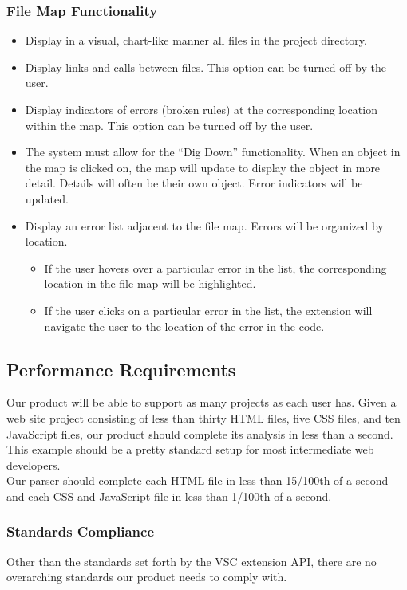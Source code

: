 \documentclass[letterpaper,10pt,titlepage,draftclsnofoot,onecolumn,onesided] {IEEEtran}
\begin{document}
\subsubsection{File Map Functionality}
\begin{itemize}
	\item Display in a visual, chart-like manner all files in the project directory.
    \item Display links and calls between files. This option can be turned off by the user.
    \item Display indicators of errors (broken rules) at the corresponding location within the map. This option can be turned off by the user.
    \item The system must allow for the “Dig Down” functionality. When an object in the map is clicked on, the map will update to display the object in more detail. Details will often be their own object. Error indicators will be updated.
    \item Display an error list adjacent to the file map. Errors will be organized by location.
    \begin{itemize}
    	\item If the user hovers over a particular error in the list, the corresponding location in the file map will be 	highlighted.
        \item If the user clicks on a particular error in the list, the extension will navigate the user to the location of the error in the code.
    \end{itemize}
\end{itemize}

\subsection{Performance Requirements}
Our product will be able to support as many projects as each user has. 
Given a web site project consisting of less than thirty HTML files, five CSS files, and ten JavaScript files, our product should complete its analysis in less than a second. 
This example should be a pretty standard setup for most intermediate web developers.
\\
Our parser should complete each HTML file in less than 15/100th of a second and each CSS and JavaScript file in less than 1/100th of a second.

\subsubsection{Standards Compliance}
Other than the standards set forth by the VSC extension API, there are no overarching standards our product needs to comply with.
\end{document}
